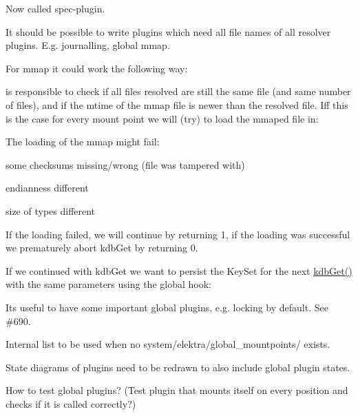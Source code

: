 Now called {\ttfamily spec}-\/plugin.

It should be possible to write plugins which need all file names of all resolver plugins. E.\+g. journalling, global mmap.

For mmap it could work the following way\+:


\begin{DoxyCode}{0}
\end{DoxyCode}


is responsible to check if all files resolved are still the same file (and same number of files), and if the {\ttfamily mtime} of the mmap file is newer than the resolved file. Iff this is the case for every mount point we will (try) to load the mmaped file in\+:


\begin{DoxyCode}{0}
\end{DoxyCode}


The loading of the mmap might fail\+:


\begin{DoxyItemize}
\item some checksums missing/wrong (file was tampered with)
\item endianness different
\item size of types different
\end{DoxyItemize}

If the loading failed, we will continue by returning 1, if the loading was successful we prematurely abort {\ttfamily kdb\+Get} by returning 0.

If we continued with {\ttfamily kdb\+Get} we want to persist the Key\+Set for the next {\ttfamily \mbox{\hyperlink{group__kdb_ga28e385fd9cb7ccfe0b2f1ed2f62453a1}{kdb\+Get()}}} with the same parameters using the global hook\+:


\begin{DoxyCode}{0}
\end{DoxyCode}


Its useful to have some important global plugins, e.\+g. locking by default. See \#690.

Internal list to be used when no system/elektra/global\+\_\+mountpoints/ exists.

State diagrams of plugins need to be redrawn to also include global plugin states.


\begin{DoxyItemize}
\item How to test global plugins? (Test plugin that mounts itself on every position and checks if it is called correctly?)
\end{DoxyItemize}


